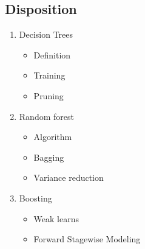 \documentclass[a4, english]{article}
\begin{document}
\subsection{Disposition}
\begin{enumerate}
  \item Decision Trees 
  \begin{itemize}
  	\item Definition
    \item Training
    \item Pruning 
  \end{itemize}
  \item Random forest
  \begin{itemize}
  	\item Algorithm
    \item Bagging
    \item Variance reduction 
  \end{itemize}
  \item Boosting 
  \begin{itemize}
  	\item Weak learns 
    \item Forward Stagewise Modeling
  \end{itemize}
\end{enumerate}
\newpage
\end{document}
